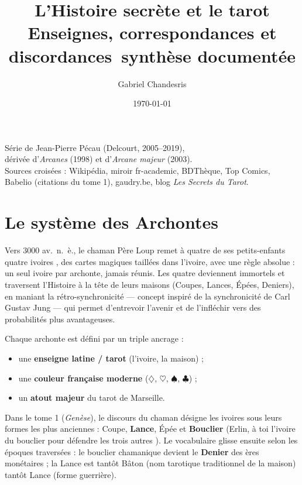 \documentclass[11pt,a5paper]{article}
\title{\textbf{L'Histoire secrète et le tarot}\\
\large Enseignes, correspondances et discordances~\newline synthèse documentée}
\author{Gabriel Chandesris}
\date{\today}
\newcommand{\carreau}{\ensuremath{\diamondsuit}}
\newcommand{\coeur}{\ensuremath{\heartsuit}}
\newcommand{\pique}{\ensuremath{\spadesuit}}
\newcommand{\trefle}{\ensuremath{\clubsuit}}
\begin{document}
\maketitle

\begin{center}
\small Série de Jean-Pierre Pécau (Delcourt, 2005--2019), \\ 
dérivée d'\emph{Arcanes} (1998) et d'\emph{Arcane majeur} (2003).\\
Sources croisées : Wikipédia, miroir fr-academic, BDThèque, Top Comics,\\
Babelio (citations du tome 1), gaudry.be, blog \emph{Les Secrets du Tarot}.
\end{center}

\vspace{0.5em}

\section{Le système des Archontes}

Vers 3000 av.~n.~è., le chaman Père Loup remet à quatre de ses petits-enfants
quatre \og ivoires \fg{}, des cartes magiques taillées dans l'ivoire, avec une
règle absolue : un seul ivoire par archonte, jamais réunis. Les quatre
deviennent immortels et traversent l'Histoire à la tête de leurs
\og maisons \fg{} (Coupes, Lances, Épées, Deniers), en maniant la
\og rétro-synchronicité \fg{} --- concept inspiré de la synchronicité de
Carl Gustav Jung --- qui permet d'entrevoir l'avenir et de l'infléchir vers
des probabilités plus avantageuses.

Chaque archonte est défini par un triple ancrage :
\begin{itemize}
\item une \textbf{enseigne latine / tarot} (l'ivoire, la maison) ;
\item une \textbf{couleur française moderne} (\carreau{}, \coeur{}, \pique{}, \trefle{}) ;
\item un \textbf{atout majeur} du tarot de Marseille.
\end{itemize}

Dans le tome 1 (\emph{Genèse}), le discours du chaman désigne les ivoires sous
leurs formes les plus anciennes : Coupe, \textbf{Lance}, Épée et
\textbf{Bouclier} (\og Erlin, à toi l'ivoire du bouclier pour défendre les
trois autres \fg{}). Le vocabulaire glisse ensuite selon les époques
traversées : le bouclier chamanique devient le \textbf{Denier} des ères
monétaires ; la Lance est tantôt \og Bâton \fg{} (nom tarotique traditionnel
de la maison) tantôt \og Lance \fg{} (forme guerrière).
\end{document}
